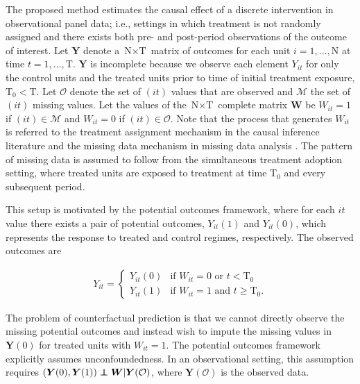 \documentclass[hidelinks,12pt]{article}
\newcommand\independent{\protect\mathpalette{\protect\independenT}{\perp}}
\def\independenT#1#2{\mathrel{\rlap{$#1#2$}\mkern2mu{#1#2}}}
\begin{document}
The proposed method estimates the causal effect of a discrete intervention in observational panel data; i.e., settings in which treatment is not randomly assigned and there exists both pre- and post-period observations of the outcome of interest. Let $\boldsymbol{Y}$ denote a $\text{N} \times \text{T}$ matrix of outcomes for each unit $i =1, \ldots, \text{N}$ at time $t = 1, \ldots, \text{T}$. $\boldsymbol{Y}$ is incomplete because we observe each element $Y_{it}$ for only the control units and the treated units prior to time of initial treatment exposure, $\text{T}_0 < \text{T}$. Let $\mathcal{O}$ denote the set of $(it)$ values that are observed and $\mathcal{M}$ the set of $(it)$ missing values. Let the values of the $\text{N} \times \text{T}$ complete matrix $\boldsymbol{W}$ be $W_{it} =1$ if $(it) \in \mathcal{M}$ and $W_{it} = 0$ if $(it) \in \mathcal{O}$. Note that the process that generates $W_{it}$ is referred to the treatment assignment mechanism in the causal inference literature \citep{imbens2015causal} and the missing data mechanism in missing data analysis \citep{little2014}. The pattern of missing data is assumed to follow from the simultaneous treatment adoption setting, where treated units are exposed to treatment at time $\text{T}_0$ and every subsequent period. 

This setup is motivated by the \citet{neyman1923} potential outcomes framework, where for each $it$ value there exists a pair of potential outcomes, $Y_{it}(1)$ and $Y_{it}(0)$, which represents the response to treated and control regimes, respectively. The observed outcomes are 

\begin{align} 
Y_{it} = \begin{cases}
Y_{it}(0) 	& \mbox{if } W_{it} = 0  \text{ or } t < \text{T}_0 \\
Y_{it}(1) 	& \mbox{if } W_{it} = 1  \text{ and } t \geq \text{T}_0.
\end{cases} 
\end{align} 

The problem of counterfactual prediction is that we cannot directly observe the missing potential outcomes and instead wish to impute the missing values in $\boldsymbol{Y}(0)$ for treated units with $W_{it} =1$.  The potential outcomes framework explicitly assumes unconfoundedness. In an observational setting, this assumption requires $(\boldsymbol{Y}(0), \boldsymbol{Y}(1)) \independent \boldsymbol{W}| \boldsymbol{Y}(\mathcal{O})$, where $\boldsymbol{Y}(\mathcal{O})$ is the observed data. 
\end{document}
